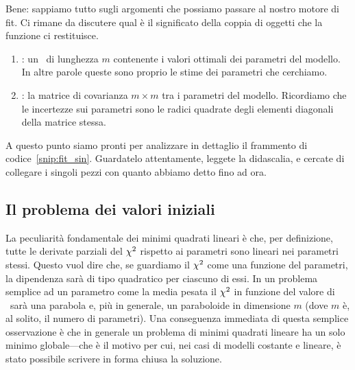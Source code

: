 Bene: sappiamo tutto sugli argomenti che possiamo passare al nostro motore
di fit. Ci rimane da discutere qual è il significato della coppia di oggetti
che la funzione ci restituisce.
\begin{enumerate}
\item {}: un \nparray\ di lunghezza $m$
  contenente i valori ottimali dei parametri del modello. In altre parole
  queste sono proprio le stime dei parametri che cerchiamo.
\item {}: la matrice di covarianza $m \times m$ tra i parametri del
  modello. Ricordiamo che le incertezze sui parametri sono le radici quadrate
  degli elementi diagonali della matrice stessa.
\end{enumerate}


A questo punto siamo pronti per analizzare in dettaglio il frammento di
codice~\ref{snip:fit_sin}. Guardatelo attentamente, leggete la didascalia, e
cercate di collegare i singoli pezzi con quanto abbiamo detto fino ad ora.


\subsection{Il problema dei valori iniziali}

La peculiarità fondamentale dei minimi quadrati lineari è che, per
definizione, tutte le derivate parziali del $\chi^2$ rispetto ai parametri sono
lineari nei parametri stessi. Questo vuol dire che, se guardiamo il $\chi^2$
come una funzione del parametri, la dipendenza sarà di tipo quadratico per
ciascuno di essi. In un problema semplice ad un parametro come la media pesata
il $\chi^2$ in funzione del valore di \bestfit\ sarà una parabola e,
più in generale, un paraboloide in dimensione $m$ (dove $m$ è, al solito,
il numero di parametri). Una conseguenza immediata di questa semplice
osservazione è che in generale un problema di minimi quadrati lineare ha un
solo minimo globale---che è il motivo per cui, nei casi di modelli costante
e lineare, è stato possibile scrivere in forma chiusa la soluzione.

